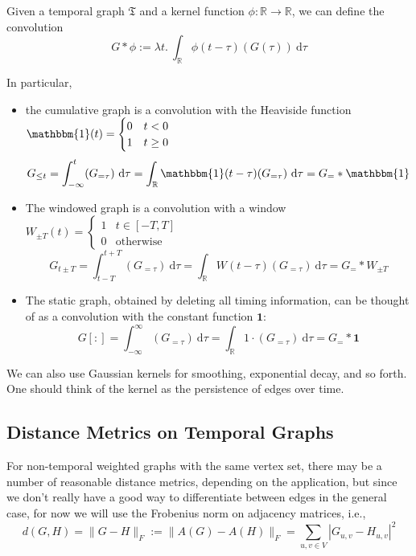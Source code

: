 \documentclass{article}
\theoremstyle{definition}
\begin{document}
	Given a temporal graph $\mathfrak T$ and a kernel function $\phi: \mathbb R \to \mathbb R$, we can define the convolution
	\begin{equation*}
		G \ast \phi := \lambda t.~\int_{\mathbb R}  \phi(t - \tau)(G(\tau))~\mathrm d \tau
	\end{equation*}
	
	In particular,
	\begin{itemize}
		\item 
		 the cumulative graph is a convolution with the Heaviside function $\mathbbm{1}(t) = \begin{cases}
		0 & t < 0 \\ 1 & t \geq 0
		\end{cases}$
		\begin{equation*}
			G_{\leq t} = \int_{-\infty}^t (G_{=\tau} )~\mathrm d \tau  = \int_{\mathbb R} \mathbbm{1}(t - \tau) (G_{=\tau} )~\mathrm d \tau = G_{=} \ast \mathbbm{1} 
		\end{equation*}
		
		\item The windowed graph is a convolution with a window $W_{\pm T}(t) = \begin{cases} 1 & t \in [-T, T]\\ 0 & \text{otherwise}\end{cases}$
		\begin{equation*}
		G_{t \pm T} = \int_{t-T}^{t+T} (G_{=\tau} )~\mathrm d \tau  = \int_{\mathbb R} W(t- \tau) (G_{=\tau} )~\mathrm d \tau = G_{=} \ast W_{\pm T} 
		\end{equation*}	
		
		\item The static graph, obtained by deleting all timing information, can be thought of as a convolution with the constant function $\mathbf 1$:
		\begin{equation*}
			G[:] = \int_{-\infty}^{\infty} (G_{=\tau} )~\mathrm d \tau  = \int_{\mathbb R} 1 \cdot (G_{=\tau} )~\mathrm d \tau = G_{=} \ast \mathbf 1 
		\end{equation*}
	\end{itemize}
	We can also use Gaussian kernels for smoothing, exponential decay, and so forth. One should think of the kernel as the persistence of edges over time.
	
	\subsection{Distance Metrics on Temporal Graphs}
	For non-temporal weighted graphs with the same vertex set, there may be a number of reasonable distance metrics, depending on the application, but since we don't really have a good way to differentiate between edges in the general case, for now we will use the Frobenius norm on adjacency matrices, i.e.,
	\[ d(G,H) = \Big\lVert G - H \Big\rVert_F :=  \Big\lVert A(G) - A(H) \Big\rVert_F = \sum_{u,v \in V} | G_{u,v} - H_{u,v} |^2 \]
	
\end{document}
